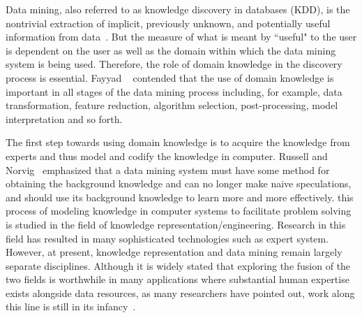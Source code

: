 

Data mining, also referred to as knowledge discovery in databases (KDD), is the nontrivial extraction of implicit, previously unknown, and potentially useful information from data~\cite{Frawley1992}. But the measure of what is meant by ``useful" to the user is dependent on the user as well as the domain within which the data mining system is being used. Therefore, the role of domain knowledge in the discovery process is essential. Fayyad \etal~\cite{Fayyad96} contended that the use of domain knowledge is important in all stages of the data mining process including, for example, data transformation, feature reduction, algorithm selection, post-processing, model interpretation and so forth.

The first step towards using domain knowledge is to acquire the knowledge from experts and thus model and codify the knowledge in computer. Russell and Norvig~\cite{Russell03} emphasized that a data mining system must have some method for obtaining the background knowledge and can no longer make naive speculations, and should use its background knowledge to learn more and more effectively. this process of modeling knowledge in computer systems to facilitate problem solving is studied in the field of knowledge representation/engineering. Research in this field has resulted in many sophisticated technologies such as expert system. However, at present, knowledge representation and data mining remain largely separate disciplines. Although it is widely stated that exploring the fusion of the two fields is worthwhile in many applications where substantial human expertise exists alongside data resources, as many researchers have pointed out, work along this line is still in its infancy~\cite{Hirsh94, Weiss01, Daniels01, Kopanas02, Langseth03}.

